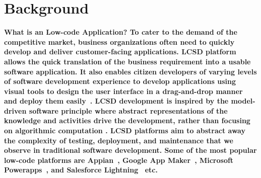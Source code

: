 \section{Background} \label{sec:background}
\nd\bf{What is an  Low-code Application?} To cater to the demand of the competitive market, business organizations often need to quickly develop and deliver customer-facing applications.  LCSD platform allows the quick translation of the business requirement into a usable software application. It also enables citizen developers of varying levels of software development experience to develop applications using visual tools to design the user interface in a drag-and-drop manner and deploy them easily~\cite{lowcodewiki}.  LCSD development is inspired by the model-driven software principle where abstract representations of the knowledge and activities drive the development, rather than focusing on algorithmic computation \cite{sahay2020supporting}.  LCSD platforms aim to abstract away the complexity of testing, deployment, and maintenance that we observe in traditional software development. Some of the most popular low-code platforms are Appian~\cite{appian}, Google App Maker~\cite{googleappmaker}, Microsoft Powerapps~\cite{powerapps}, and Salesforce Lightning~\cite{salesforce} etc. 


